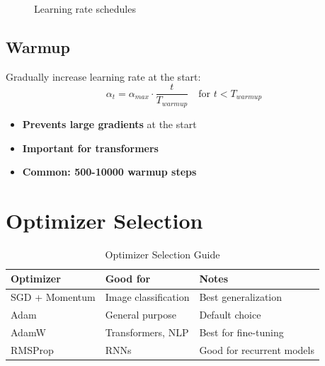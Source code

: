 \begin{figure}[h]
    \centering
    \caption{Learning rate schedules}
    \label{fig:lr_schedules}
\end{figure}

\subsection{Warmup}

Gradually increase learning rate at the start:
\begin{equation}
\alpha_t = \alpha_{max} \cdot \frac{t}{T_{warmup}} \quad \text{for } t < T_{warmup}
\end{equation}

\begin{itemize}
    \item \textbf{Prevents large gradients} at the start
    \item \textbf{Important for transformers}
    \item \textbf{Common: 500-10000 warmup steps}
\end{itemize}

\section{Optimizer Selection}

\begin{table}[h]
    \centering
    \caption{Optimizer Selection Guide}
    \begin{tabular}{L{2.5cm} L{3cm} L{3.5cm}}
        \toprule
        \textbf{Optimizer} & \textbf{Good for} & \textbf{Notes} \\
        \midrule
        SGD + Momentum & Image classification & Best generalization \\
        Adam & General purpose & Default choice \\
        AdamW & Transformers, NLP & Best for fine-tuning \\
        RMSProp & RNNs & Good for recurrent models \\
        \bottomrule
    \end{tabular}
\end{table}

